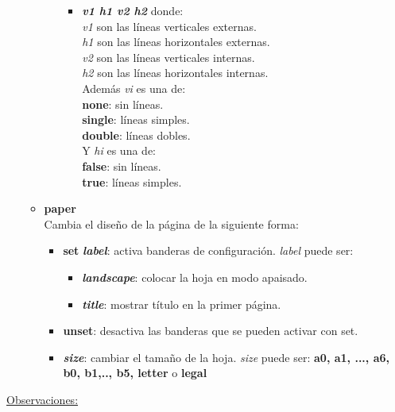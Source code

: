 \documentclass[a4paper,12pt]{article}
\begin{document}
\begin{itemize}
\begin{itemize}
\begin{itemize}
\begin{itemize}
				\item \textit{\textbf{v1 h1 v2 h2}} donde:\\
				 \textit{v1} son las líneas verticales externas.\\
 				 \textit{h1} son las líneas horizontales externas.\\
 				 \textit{v2} son las líneas verticales internas.\\
 				 \textit{h2} son las líneas horizontales internas.\\
 				 Además \textit{vi} es una de:\\
 				 \textbf{none}: sin líneas.\\
 				 \textbf{single}: líneas simples.\\
 				 \textbf{double}: líneas dobles.\\
 				 Y \textit{hi} es una de:\\
 				 \textbf{false}: sin líneas.\\
 				 \textbf{true}: líneas simples.\\
				\end{itemize}
			\end{itemize}
			\item \textbf{paper}\\
			Cambia el diseño de la página de la siguiente forma:
			\begin{itemize}
			\item \textbf{set} \textit{\textbf{label}}: activa banderas de configuración. \textit{label} puede ser:
			\begin{itemize}
			\item \textbf{\textit{landscape}}: colocar la hoja en modo apaisado.
			\item \textbf{\textit{title}}: mostrar título en la primer página.
			\end{itemize}
			\item \textbf{unset}: desactiva las banderas que se pueden activar con set.
			\item \textbf{\textit{size}}: cambiar el tamaño de la hoja. \textit{size} puede ser: \textbf{a0, a1, ..., a6, b0, b1,.., b5, letter} o \textbf{legal}
			\end{itemize}
		\end{itemize}
	\end{itemize}
\newpage
\underline{Observaciones:}
\end{document}
